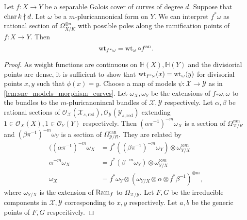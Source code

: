 \begin{theorem}\label{prop:weightfunction_fullback}
	Let $f: X \to Y$ be a separable Galois cover of curves of degree $d$. 
	Suppose that $\operatorname{char} k \nmid d$. 
	Let $\omega $ be a $m$-pluricannonical form on $Y$. 
	We can interpret $f^*\omega$ as rational section of $\Omega_{X / K}^{\otimes n}$ with possible poles along the ramification points of $f: X \to Y$. 
	Then \[
		\operatorname{wt}_{f^*\omega} = \operatorname{wt}_{\omega} \circ f{}^{\text{an}}
	.\] 
\end{theorem}
\begin{proof}
	As weight functions are continuous on $\mathbb{H}(X), \mathbb{H}(Y)$ and the divisiorial points are dense, it is sufficient to show that $\operatorname{wt}_{f^* \omega}(x) = \operatorname{wt}_{\omega}(y)$ 
	for divisorial points  $x, y$ such that $\phi(x) = y$. 
	Choose a map of models $\psi: \mathscr X \to \mathscr Y$ as in \cref{lem:snc_models_morphism_curves}.  
	Let $\omega_X, \omega_Y$ be the extensions of $f_*\omega, \omega$ to the bundles to the $m$-pluricanonincal bundles of $\mathscr X, \mathscr Y$ respectively. 
	Let $\alpha, \beta$ be rational sections of $\mathcal{O}_{\mathscr X}(\mathscr X_{s, \text{red}}), \mathcal{O}_{\mathscr Y}(\mathscr Y_{s, \text{red}} )$ extending $1 \in \mathcal{O}_X(X), 1 \in \mathcal{O}_Y(Y)$ respectively. 
	Then $(\alpha \pi^{-1})^{-m}\omega_{X}$ is a section of $\Omega^{\text{can}}_{\mathscr X / R}$ and $(\beta\pi^{-1})^{-m} \omega_{Y}$ is a section of $\Omega^{\text{can}}_{\mathscr Y / R}$. 
	They are related by \begin{align*}
		((\alpha \pi^{-1})^{-m} \omega_X &= f^*((\beta \pi^{-1})^{-m}\omega_Y) \otimes \omega_{Y / X}^{\otimes m} \\
		\alpha ^{-m} \omega_X &= f^*(\beta ^{-m}\omega_Y) \otimes \omega_{Y / X}^{\otimes m} \\
		\omega_{X} &= f^* \omega_{Y} \otimes (\omega_{Y / X} \otimes \alpha \otimes f^*\beta ^{-1})^{\otimes m}
	,\end{align*} 
	where $\omega_{ Y /  X}$ is the extension of $\operatorname{Ram}_f$ to $\Omega_{\mathscr X / \mathscr Y}$.
	Let $F, G$ be the irreducible components in $\mathscr X, \mathscr Y$ corresponding to $x, y$ respectively. 
	Let $a, b$ be the generic points of $F, G$ respecitively. 


\end{proof}
